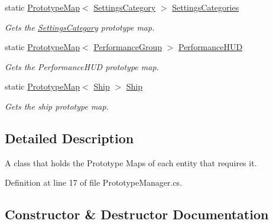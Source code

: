 \begin{DoxyCompactItemize}
static \hyperlink{class_prototype_map}{Prototype\+Map}$<$ \hyperlink{class_settings_category}{Settings\+Category} $>$ \hyperlink{class_prototype_manager_a5da831219902f9c4a65cf214c86403fd}{Settings\+Categories}
\begin{DoxyCompactList}\small\item\em Gets the \hyperlink{class_settings_category}{Settings\+Category} prototype map. \end{DoxyCompactList}\item 
static \hyperlink{class_prototype_map}{Prototype\+Map}$<$ \hyperlink{class_performance_group}{Performance\+Group} $>$ \hyperlink{class_prototype_manager_af7e92bac47335baac523f475683ed2a8}{Performance\+H\+UD}
\begin{DoxyCompactList}\small\item\em Gets the Performance\+H\+UD prototype map. \end{DoxyCompactList}\item 
static \hyperlink{class_prototype_map}{Prototype\+Map}$<$ \hyperlink{class_ship}{Ship} $>$ \hyperlink{class_prototype_manager_a2e39f326d55d2bab6956b6dc98fd0177}{Ship}
\begin{DoxyCompactList}\small\item\em Gets the ship prototype map. \end{DoxyCompactList}\end{DoxyCompactItemize}


\subsection{Detailed Description}
A class that holds the Prototype Maps of each entity that requires it. 



Definition at line 17 of file Prototype\+Manager.\+cs.



\subsection{Constructor \& Destructor Documentation}
\mbox{\label{class_prototype_manager_a9392bb86cd33a73f3729e220e5461bc9}} 

